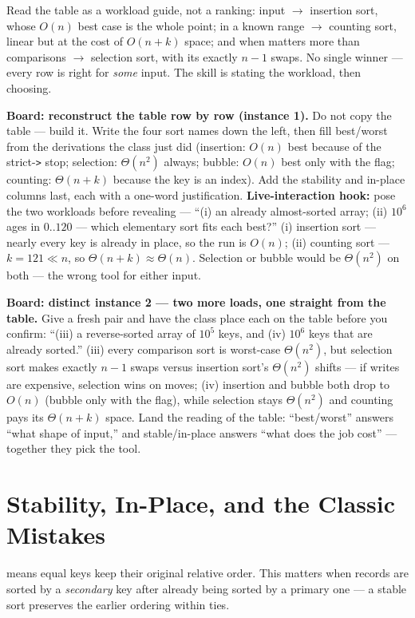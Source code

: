 \documentclass[11pt]{article}
\begin{document}
Read the table as a workload guide, not a ranking:  input $\to$ insertion sort, whose $O(n)$ best case is the whole point;  in a known range $\to$ counting sort, linear but at the cost of $O(n+k)$ space; and when  matters more than comparisons $\to$ selection sort, with its exactly $n-1$ swaps. No single winner --- every row is right for \emph{some} input. The skill is stating the workload, then choosing.

\textbf{Board: reconstruct the table row by row (instance 1).} Do not copy the table --- build it. Write the four sort names down the left, then fill best/worst from the derivations the class just did (insertion: $O(n)$ best because of the strict-\texttt{>} stop; selection: $\Theta(n^2)$ always; bubble: $O(n)$ best only with the flag; counting: $\Theta(n+k)$ because the key is an index). Add the stability and in-place columns last, each with a one-word justification. \textbf{Live-interaction hook:} pose the two workloads before revealing --- ``(i) an already almost-sorted array; (ii) $10^6$ ages in $0..120$ --- which elementary sort fits each best?'' (i) insertion sort --- nearly every key is already in place, so the run is $O(n)$; (ii) counting sort --- $k = 121 \ll n$, so $\Theta(n+k) \approx \Theta(n)$. Selection or bubble would be $\Theta(n^2)$ on both --- the wrong tool for either input.

\textbf{Board: distinct instance 2 --- two more loads, one straight from the table.} Give a fresh pair and have the class place each on the table before you confirm: ``(iii) a reverse-sorted array of $10^5$ keys, and (iv) $10^6$ keys that are already sorted.'' (iii) every comparison sort is worst-case $\Theta(n^2)$, but selection sort makes exactly $n-1$ swaps versus insertion sort's $\Theta(n^2)$ shifts --- if writes are expensive, selection wins on moves; (iv) insertion and bubble both drop to $O(n)$ (bubble only with the flag), while selection stays $\Theta(n^2)$ and counting pays its $\Theta(n+k)$ space. Land the reading of the table: ``best/worst'' answers ``what shape of input,'' and stable/in-place answers ``what does the job cost'' --- together they pick the tool.

\section{Stability, In-Place, and the Classic Mistakes}

 means equal keys keep their original relative order. This matters when records are sorted by a \emph{secondary} key after already being sorted by a primary one --- a stable sort preserves the earlier ordering within ties.
\end{document}
